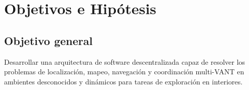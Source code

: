 \documentclass[sigconf]{acmart}
\begin{document}



\section{Objetivos e Hipótesis}

\subsection*{Objetivo general}

Desarrollar una arquitectura de software descentralizada capaz de resolver los problemas de localización, mapeo, navegación y coordinación multi-VANT en ambientes desconocidos y dinámicos para tareas de exploración en interiores.
\end{document}
